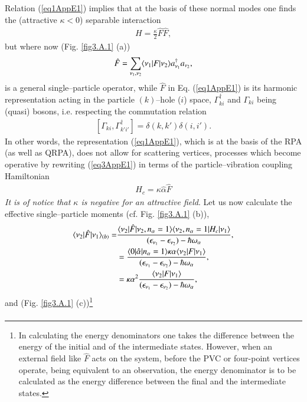 \begin{subappendices}
Relation (\ref{eq1AppE1}) implies that at the basis of these normal modes one finds the (attractive $\kappa<0$) separable interaction 
\begin{align}\label{eq3AppE1}
H=\frac{\kappa}{2}\hat F\hat F,
\end{align}
but where now (Fig. \ref{fig3.A.1} (a))
\begin{align}
\hat F=\sum_{\nu_1,\nu_2} \langle {\nu_1|F|\nu_2} \rangle a^\dagger_{\nu_1}a_{\nu_2},
\end{align}
is a general single--particle operator, while $\hat F$ in  Eq. (\ref{eq1AppE1}) is its harmonic representation acting in the particle $(k)$--hole ($i$) space, $\Gamma^\dagger_{ki}$ and $\Gamma_{ki}$ being (quasi) bosons, i.e. respecting the commutation relation 
\begin{align}
\left[\Gamma_{ki},\Gamma^\dagger_{k'i'}\right]=\delta(k,k')\delta(i,i').
\end{align}
In other words, the representation (\ref{eq1AppE1}), which is at the basis of the RPA (as well as QRPA), does not allow for scattering vertices, processes which become operative by rewriting (\ref{eq3AppE1}) in terms of the particle--vibration coupling Hamiltonian
\begin{align}\label{eq3AppE4}
H_c=\kappa\hat \alpha\hat F
\end{align}
\emph{It is of notice that $\kappa$ is negative for an attractive field}. Let us now calculate the effective single--particle moments (cf. Fig. \ref{fig3.A.1} (b)),
\begin{align}
\nonumber \langle {\nu_2|\hat F|\nu_1} \rangle_{(b)}=&\frac{\langle {\nu_2|\hat F|\nu_2,n_\alpha=1} \rangle\langle {\nu_2,n_\alpha=1|H_c|\nu_1} \rangle}{(\epsilon_{\nu_1}-\epsilon_{\nu_2})-\hbar\omega_\alpha},\\
\nonumber &=\frac{\langle {0|\hat \alpha|n_\alpha=1} \rangle\kappa\alpha \langle {\nu_2|F|\nu_1} \rangle}{(\epsilon_{\nu_1}-\epsilon_{\nu_2})-\hbar\omega_\alpha},\\
&=\kappa\alpha^2\frac{ \langle {\nu_2|F|\nu_1} \rangle}{(\epsilon_{\nu_1}-\epsilon_{\nu_2})-\hbar\omega_\alpha},
\end{align}
and (Fig. \ref{fig3.A.1} (c))\footnote{In calculating the energy denominators one takes the difference between the energy of the initial and of the intermediate states. However, when an external field like $\hat F$ acts on the system, before the PVC or four-point vertices operate, being equivalent to an observation, the energy denominator is to be calculated as the energy difference between the final and the intermediate states. }
\begin{align}\label{eq8App1E}

\end{align}
\end{subappendices}
